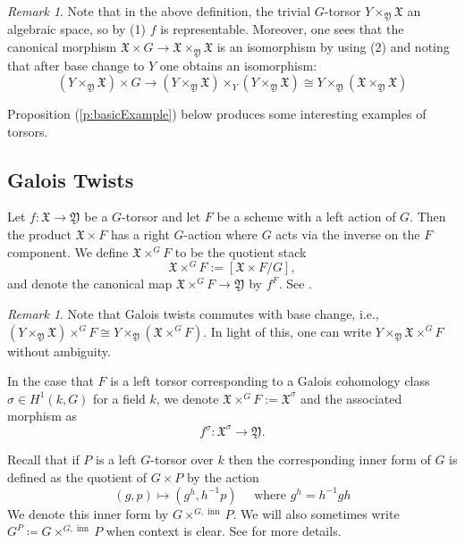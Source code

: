 \documentclass[12pt, final]{amsart}
\theoremstyle{remark}
\newtheorem{remark}[example]{Remark}
\theoremstyle{definition}
\theoremstyle{plain}
\newcommand{\fX}{{\mathfrak X}}
\newcommand{\fY}{{\mathfrak Y}}
\DeclareMathOperator{\inn}{inn}
\begin{document}
\begin{remark}\label{r:basic}
    Note that in the above definition, the trivial $G$-torsor $Y \times_\fY \fX$ an algebraic space, so by  (1)
    $f$ is representable. Moreover, one sees that the canonical morphism
    $ \fX \times G \to \fX \times_\fY \fX$ is an isomorphism by using 
     (2)
    and noting that after base change to $Y$ one obtains an isomorphism:
    $$(Y \times_\fY \fX) \times G \to  (Y \times_\fY \fX) \times_Y (Y \times_\fY \fX) \cong Y \times_\fY (\fX \times_\fY \fX)$$
\end{remark}

Proposition (\ref{p:basicExample}) below produces some interesting examples of torsors. 

\subsection{Galois Twists}\label{subsec:Galois-twist}

Let $f: \fX \to \fY$ be a $G$-torsor and let $F$ be a scheme with a left action of $G$. Then the product $\fX\times F$ has a right $G$-action 
where $G$ acts via the inverse on the $F$ component. We define $\fX\times^{G}F $ to be the quotient stack 
$$
\fX\times^{G}F := [\fX\times F/G],
$$
and denote the canonical map $\fX \times^G F \to \fY$ by $f^F$. 
See \cite[4.2]{ginot}.

\begin{remark}
    Note that Galois twists commutes with base change, i.e.,  
    $(Y\times_\fY \fX) \times^G F \cong Y \times_\fY (\fX \times^G F)$.
    In light of this, one can write 
    $Y \times_\fY \fX \times^G F$ without ambiguity.
\end{remark}

In the case that $F$ is a left torsor corresponding to a Galois cohomology class $\sigma\in H^1(k, G)$ for a field $k$, we denote 
$\fX \times^{G} F:= \fX^\sigma $ and the associated morphism as 
$$
f^{\sigma}: \fX^{\sigma}\to \fY. 
$$


Recall that if $P$ is a left $G$-torsor over $k$ then the corresponding inner form of $G$ is 
defined as the quotient of $G\times P$ by the action 
$$
(g,p)\longmapsto (g^h,h^{-1}p) \quad \text{ where } g^{h}=h^{-1}gh
$$
We denote this inner form by $G\times^{G,\inn} P$. We will also sometimes write 
$G^P \coloneqq G \times^{G,\inn}P$ when context is clear. See  for more details.
\end{document}
